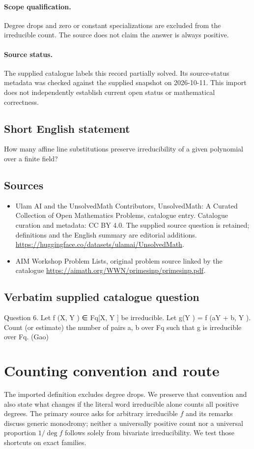 \documentclass[11pt]{article}
\begin{document}
\paragraph{Scope qualification.}
Degree drops and zero or constant specializations are excluded from the irreducible count. The source does not claim the answer is always positive.
\paragraph{Source status.}
The supplied catalogue labels this record partially solved. Its source-status metadata was checked against the supplied snapshot on 2026-10-11. This import does not independently establish current open status or mathematical correctness.
\subsection{Short English statement}
How many affine line substitutions preserve irreducibility of a given polynomial over a finite field?
\subsection{Sources}
\begin{itemize}
\item[S1] Ulam AI and the UnsolvedMath Contributors, UnsolvedMath: A Curated Collection of Open Mathematics Problems, catalogue entry. Catalogue curation and metadata: CC BY 4.0. The supplied source question is retained; definitions and the English summary are editorial additions.
\url{https://huggingface.co/datasets/ulamai/UnsolvedMath}.
\item[S2] AIM Workshop Problem Lists, original problem source linked by the catalogue
\url{https://aimath.org/WWN/primesinp/primesinp.pdf}.
\end{itemize}
\subsection{Verbatim supplied catalogue question}
Question 6. Let f (X, Y ) ∈ Fq[X, Y ] be irreducible. Let g(Y ) = f (aY + b, Y ). Count (or estimate) the number of pairs a, b over Fq such that g is irreducible over Fq. (Gao)

\section{Counting convention and route}
The imported definition excludes degree drops. We preserve that convention
and also state what changes if the literal word irreducible alone counts
all positive degrees. The primary source asks for arbitrary irreducible
$f$ and its remarks discuss generic monodromy; neither a universally
positive count nor a universal proportion $1/\deg f$ follows solely
from bivariate irreducibility. We test those shortcuts on exact families.
\end{document}
